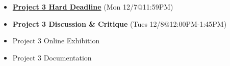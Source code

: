 \def\mon{12/7}%
\def\tues{12/8}%
% 
\begin{itemize}[noitemsep,topsep=0pt,leftmargin=*]
    \item \textcolor{defaultColor}{\ul{\textbf{Project 3 Hard Deadline}} (Mon \mon @11:59PM)}
    \item \textcolor{defaultColor}{\textbf{Project 3 Discussion \& Critique} (Tues \tues @12:00PM-1:45PM)}
    \item Project 3 Online Exhibition
    \item Project 3 Documentation
\end{itemize}